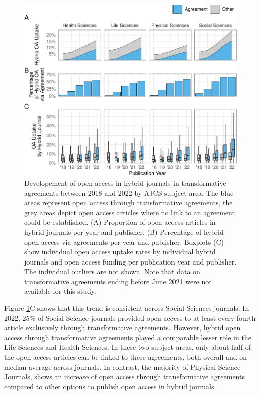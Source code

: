 \documentclass[a4paper,man,floatsintext,longtable,noextraspace,12pt]{apa6}
\begin{document}
\begin{figure}[ht!]

{\centering \includegraphics[width=0.99\linewidth,]{fig/subject_panel-1} 

}

\caption{Developement of open access in hybrid journals in transformative agreements between 2018 and 2022 by AJCS subject area. The blue areas represent open access through transformative agreements, the grey areas depict open access articles where no link to an agreement could be established. (A) Proportion of open access articles in hybrid journals per year and publisher. (B) Percentage of hybrid open access via agreements per year and publisher. Boxplots (C) show individual open access uptake rates by individual hybrid journals and open access funding per publication year and publisher. The individual outliers are not shown. Note that data on transformative agreements ending before June 2021 were not available for this study.}\label{fig:subject_panel}
\end{figure}

Figure \ref{fig:subject_panel}C shows that this trend is consistent
across Social Sciences journals. In 2022, 25\% of Social Science
journals provided open access to at least every fourth article
exclusively through transformative agreements. However, hybrid open
access through transformative agreements played a comparable lesser role
in the Life Sciences and Health Sciences. In these two subject areas,
only about half of the open access articles can be linked to these
agreements, both overall and on median average across journals. In
contrast, the majority of Physical Science Journals, shows an increase
of open access through transformative agreements compared to other
options to publish open access in hybrid journals.
\end{document}

